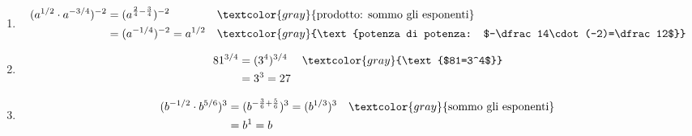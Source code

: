 \begin{question}[ID=1.2, subtitle={Potenze con esponenti frazionari}, tags={potenze, esponenti frazionari}, difficulty=media]
\begin{explanation}
\begin{enumerate}
\[\begin{aligned}
    \sqrt[3]{8^5} &= 8^{5/3}=(2^3)^{5/3} && \textcolor{gray}{\text{$8=2^3$}}\\
    &= 2^5=32
    \end{aligned}\]
    \item \[\begin{aligned}
    (a^{1/2}\cdot a^{-3/4})^{-2} &= (a^{\frac24-\frac34})^{-2} && \textcolor{gray}{\text{prodotto: sommo gli esponenti}}\\
    &= (a^{-1/4})^{-2}=a^{1/2} && \textcolor{gray}{\text{potenza di potenza: $-\dfrac14\cdot(-2)=\dfrac12$}}
    \end{aligned}\]
    \item \[\begin{aligned}
    81^{3/4} &= (3^4)^{3/4} && \textcolor{gray}{\text{$81=3^4$}}\\
    &= 3^3=27
    \end{aligned}\]
    \item \[\begin{aligned}
    (b^{-1/2}\cdot b^{5/6})^3 &= (b^{-\frac36+\frac56})^3=(b^{1/3})^3 && \textcolor{gray}{\text{sommo gli esponenti}}\\
    &= b^1=b
    \end{aligned}\]
\end{enumerate}
\end{explanation}
\end{question}


